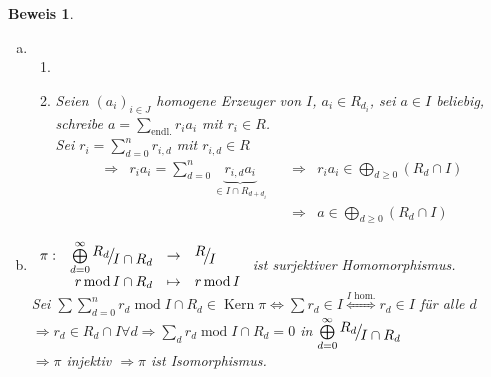 \documentclass[a4paper,12pt]{report}
\theoremstyle{break}
\theoremstyle{nonumberbreak}
\newtheorem{Bew}{Beweis}
\theoremstyle{nonumberplain}
\newcommand{\quot}[1]{\textrm{\glqq}{#1}\textrm{\grqq}}
\newcommand{\Sum}{\sum\limits}
\newenvironment{twosidedproof}{\begin{enumerate}[\quot{$\Rightarrow$}:]}{\end{enumerate}}
\newcommand{\proofforward}{\item[\quot{$\Rightarrow$}:]}
\newcommand{\proofreverse}{\item[\quot{$\Leftarrow$}:]}
\DeclareMathOperator{\Kern}{Kern}
\DeclareMathOperator{\modmodulo}{mod}%
\newcommand{\FakRaum}[2]{
  \raisebox{0.7ex}{\ensuremath{#1}}
  \ensuremath{\mkern-3mu}\big/\ensuremath{\mkern-3mu}
  \raisebox{-0.6ex}{\ensuremath{#2}}}
\begin{document}
\begin{Bew}\begin{enumerate}[a)]
\item[e)]\begin{twosidedproof}
\proofforward\checkmark

\proofreverse
	Seien $(a_i)_{i\in J}$ homogene Erzeuger von $I$, $a_i\in R_{d_i}$, sei $a\in I$ beliebig, schreibe $a = \Sum_{\text{endl.}}r_ia_i$ mit $r_i\in R$.\\
	Sei $r_i=\Sum_{d=0}^n r_{i,d}$ mit $r_{i,d}\in R$%
		\[\begin{array}{lrrr}\Rightarrow &
		r_ia_i=\sum_{d=0}^n \underbrace{r_{i,d}a_i}_{\in I\cap R_{d+d_i}} & \quad\Rightarrow & r_ia_i\in \bigoplus\limits_{d\ge0}(R_d\cap I)\\
		&& \quad \Rightarrow & a\in \bigoplus\limits_{d\ge0}(R_d\cap I)
		\end{array}\]
\end{twosidedproof}

\item[f)]
	$\begin{array}{crcl}
		\pi:&\bigoplus\limits_{d=0}^{\infty}\FakRaum{R_d}{I\cap R_d} &\to& \FakRaum{R}{I}\\
		&r\modmodulo I\cap R_d &\mapsto& r\modmodulo I
	\end{array}$ ist surjektiver Homomorphismus.\\
	Sei $\Sum\Sum_{d=0}^n r_d\modmodulo I\cap R_d\in \Kern{\pi} \Leftrightarrow \sum r_d\in I \overset{I\text{ hom.}}{\Longleftrightarrow} r_d\in I$ f\"ur alle $d$\\
	$\Rightarrow r_d\in R_d\cap I \forall d\Rightarrow \Sum_d r_d\modmodulo I\cap R_d=0$ in $\bigoplus\limits_{d=0}^{\infty}\FakRaum{R_d}{I\cap R_d}$\\
	$\Rightarrow \pi$ injektiv $\Rightarrow \pi$ ist Isomorphismus.


\end{enumerate}
\end{Bew}
\end{document}
